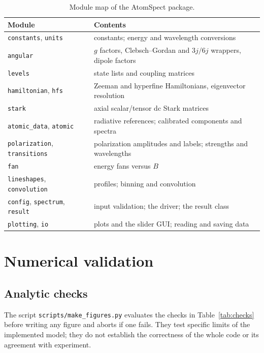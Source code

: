 \documentclass[11pt,a4paper]{article}
\newcommand{\code}[1]{\texttt{#1}}
\numberwithin{equation}{section}
\newcommand{\muB}{\mu_{\mathrm B}}
\begin{document}
\begin{table}[!htbp]
\centering\small
\begin{tabular}{ll}
\toprule
Module & Contents\\
\midrule
\code{constants}, \code{units} & constants; energy and wavelength conversions\\
\code{angular} & $g$ factors, Clebsch--Gordan and $3j/6j$ wrappers, dipole factors\\
\code{levels} & state lists and coupling matrices\\
\code{hamiltonian}, \code{hfs} & Zeeman and hyperfine Hamiltonians, eigenvector resolution\\
\code{stark} & axial scalar/tensor dc Stark matrices\\
\code{atomic\_data}, \code{atomic} & radiative references; calibrated components and spectra\\
\code{polarization}, \code{transitions} & polarization amplitudes and labels; strengths and wavelengths\\
\code{fan} & energy fans versus $B$\\
\code{lineshapes}, \code{convolution} & profiles; binning and convolution\\
\code{config}, \code{spectrum}, \code{result} & input validation; the driver; the result class\\
\code{plotting}, \code{io} & plots and the slider GUI; reading and saving data\\
\bottomrule
\end{tabular}
\caption{Module map of the AtomSpect package.}
\end{table}

\section{Numerical validation}\label{sec:validation}

\subsection{Analytic checks}
The script \code{scripts/make\_figures.py} evaluates the checks in Table~\ref{tab:checks} before writing any figure and aborts if one fails. They test specific limits of the implemented model; they do not establish the correctness of the whole code or its agreement with experiment.

\begin{table}[!htbp]
\centering\small

\caption{Analytic checks: weak-field splitting of $^3$P$_2$ against $g_J m \muB B$ (absolute, cm$^{-1}$); $^{85}$Rb 5S hyperfine interval against $A(I+\tfrac12)$ (relative); normalization; absence of $\lvert\Delta M\rvert>1$ strength; vanishing $\pi$ light along the field; profile areas and widths; weak-field HFS projection; overlapping-bin profile summation; a dark observation.}\label{tab:checks}
\end{table}
\end{document}
